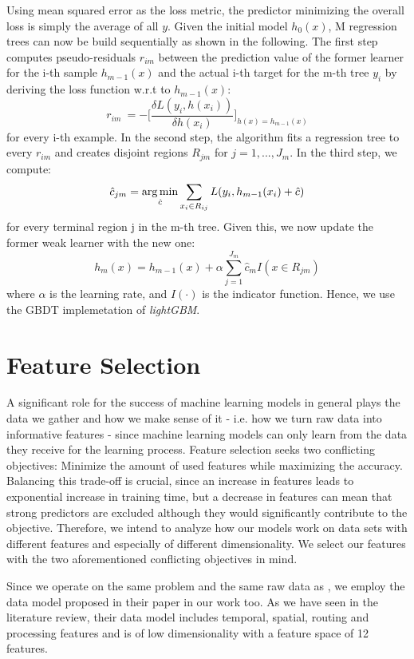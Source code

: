 Using mean squared error as the loss metric, the predictor minimizing the overall loss is simply the average of all $ y $.
Given the initial model $ h_0(x) $, M regression trees can now be build sequentially as shown in the following. 
The first step computes pseudo-residuals $ r_{im} $ between the prediction value of the former learner for the i-th sample $ h_{m-1}(x) $ and the actual i-th target for the m-th tree $ y_i $ by deriving the loss function w.r.t to $ h_{m-1}(x) $: 
\begin{equation}
	r_{im}\ = - \bigg[\dfrac{\delta L(y_i, h(x_i))}{\delta h(x_i)}\bigg]_{h(x) = h_{m-1}(x)}
\end{equation} 
for every i-th example.
In the second step, the algorithm fits a regression tree to every $ r_{im} $ and creates disjoint regions $ R_{jm} $ for $j = 1, ..., J_m$. 
In the third step, we compute: 
\begin{equation}
	\hat{c}_{jm} = \operatorname*{arg\,min}_{\hat{c}} \sum_{x_i \in R_{ij}} L(y_i, h_{m-1}(x_i) + \hat{c})
\end{equation}
for every terminal region j in the m-th tree. 
Given this, we now update the former weak learner with the new one:
\begin{equation}
	h_m(x) = h_{m-1}(x) + \alpha \sum_{j=1}^{J_m} \hat{c}_{m}I(x \in R_{jm})
\end{equation}
where $ \alpha $ is the learning rate, and $ I(\cdot) $ is the indicator function.
Hence, we use the GBDT implemetation of \textit{lightGBM}.


\section{Feature Selection}\label{sec:fs}

A significant role for the success of machine learning models in general plays the data we gather and how we make sense of it - i.e. how we turn raw data into informative features - since machine learning models can only learn from the data they receive for the learning process. Feature selection seeks two conflicting objectives: Minimize the amount of used features while maximizing the accuracy. Balancing this trade-off is crucial, since an increase in features leads to exponential increase in training time, but a decrease in features can mean that strong predictors are excluded although they would significantly contribute to the objective. Therefore, we intend to analyze how our models work on data sets with different features and especially of different dimensionality. We select our features with the two aforementioned conflicting objectives in mind.  

Since we operate on the same problem and the same raw data as \cite{Hildebrandt2020_EAT}, we employ the data model proposed in their paper in our work too. As we have seen in the literature review, their data model includes temporal, spatial, routing and processing features and is of low dimensionality with a feature space of 12 features.





